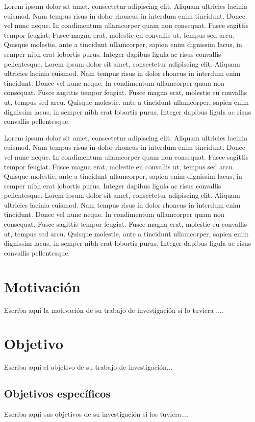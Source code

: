 Lorem ipsum dolor sit amet, consectetur adipiscing elit. Aliquam ultricies lacinia euismod. Nam tempus risus in dolor rhoncus in interdum enim tincidunt. Donec vel nunc neque. In condimentum ullamcorper quam non consequat. Fusce sagittis tempor feugiat. Fusce magna erat, molestie eu convallis ut, tempus sed arcu. Quisque molestie, ante a tincidunt ullamcorper, sapien enim dignissim lacus, in semper nibh erat lobortis purus. Integer dapibus ligula ac risus convallis pellentesque. Lorem ipsum dolor sit amet, consectetur adipiscing elit. Aliquam ultricies lacinia euismod. Nam tempus risus in dolor rhoncus in interdum enim tincidunt. Donec vel nunc neque. In condimentum ullamcorper quam non consequat. Fusce sagittis tempor feugiat. Fusce magna erat, molestie eu convallis ut, tempus sed arcu. Quisque molestie, ante a tincidunt ullamcorper, sapien enim dignissim lacus, in semper nibh erat lobortis purus. Integer dapibus ligula ac risus convallis pellentesque.

Lorem ipsum dolor sit amet, consectetur adipiscing elit. Aliquam ultricies lacinia euismod. Nam tempus risus in dolor rhoncus in interdum enim tincidunt. Donec vel nunc neque. In condimentum ullamcorper quam non consequat. Fusce sagittis tempor feugiat. Fusce magna erat, molestie eu convallis ut, tempus sed arcu. Quisque molestie, ante a tincidunt ullamcorper, sapien enim dignissim lacus, in semper nibh erat lobortis purus. Integer dapibus ligula ac risus convallis pellentesque. Lorem ipsum dolor sit amet, consectetur adipiscing elit. Aliquam ultricies lacinia euismod. Nam tempus risus in dolor rhoncus in interdum enim tincidunt. Donec vel nunc neque. In condimentum ullamcorper quam non consequat. Fusce sagittis tempor feugiat. Fusce magna erat, molestie eu convallis ut, tempus sed arcu. Quisque molestie, ante a tincidunt ullamcorper, sapien enim dignissim lacus, in semper nibh erat lobortis purus. Integer dapibus ligula ac risus convallis pellentesque. 

\section{Motivación}
Escriba aquí la motivación de su trabajo de investigación si lo tuviera ....


\section{Objetivo}
Escriba aquí el objetivo de su trabajo de investigación... 

\subsection{Objetivos específicos}
Escriba aquí sus objetivos de su investigación si los tuviera.... 

